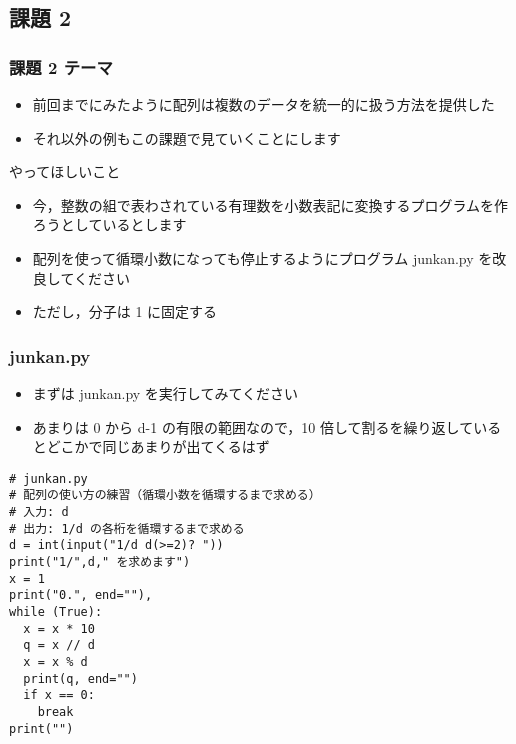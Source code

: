 \subsection{課題 2}
\begin{frame}[label=quiz2]
\frametitle{課題 2 テーマ}
  \begin{itemize}
\item 前回までにみたように配列は複数のデータを統一的に扱う方法を提供した
\item それ以外の例もこの課題で見ていくことにします
  \end{itemize}
  \begin{block}{やってほしいこと}
    \begin{itemize}
\item 今，整数の組で表わされている有理数を小数表記に変換するプログラムを作ろうとしているとします
\item 配列を使って循環小数になっても停止するようにプログラム junkan.py を改良してください
\item ただし，分子は 1 に固定する
    \end{itemize}
  \end{block}
\end{frame}
\begin{frame}
\frametitle{junkan.py}
  \begin{itemize}
\item まずは junkan.py を実行してみてください
\item あまりは 0 から d-1 の有限の範囲なので，10 倍して割るを繰り返しているとどこかで同じあまりが出てくるはず
  \end{itemize}
  \begin{lstlisting}[caption={junkan.py},label=lst:rational]
# junkan.py
# 配列の使い方の練習（循環小数を循環するまで求める）
# 入力: d
# 出力: 1/d の各桁を循環するまで求める
d = int(input("1/d d(>=2)? "))
print("1/",d," を求めます")
x = 1
print("0.", end=""),
while (True):
  x = x * 10
  q = x // d
  x = x % d
  print(q, end="")
  if x == 0:
    break
print("")
  \end{lstlisting}
\end{frame}
